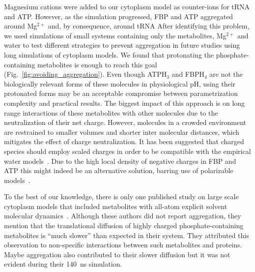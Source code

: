 \documentclass[journal=jcisd8,manuscript=article]{achemso}
\begin{document}
Magnesium cations were added to our cytoplasm model as counter-ions
for tRNA and ATP. However, as the simulation progressed, FBP and ATP
aggregated around Mg$^{2+}$ and, by consequence, around tRNA
  After identifying this problem, we used simulations of
small systems containing only the metabolites, Mg$^{2+}$ and water to
test different strategies to prevent aggregation in future studies
using long simulations of cytoplasm models. We found that protonating
the phosphate-containing metabolites is enough to reach this goal
(Fig.~\ref{fig:avoiding_aggregation}). Even though ATPH$_3$ and
FBPH$_4$ are not the biologically relevant forms of these molecules in
physiological pH, using their protonated forms may be an acceptable
compromise between parametrization complexity and practical
results. The biggest impact of this approach is on long range
interactions of these metabolites with other molecules due to the
neutralization of their net charge. However, molecules in a crowded
environment are restrained to smaller volumes and shorter inter
molecular distances, which mitigates the effect of charge
neutralization. It has been suggested that charged species should
employ scaled charges in order to be compatible with the empirical
water models~\cite{Leontyev2009a,Leontyev2011a}. Due to the high local
density of negative charges in FBP and ATP this might indeed be an
alternative solution, barring use of polarizable
models~\cite{Ponder2010a,Lopes2013a,Ghahremanpour2018b,Walz2018a}.


To the best of our knowledge, there is only one published study on large scale cytoplasm models that
included metabolites with all-atom explicit solvent molecular
dynamics~\cite{Yu2016a}. Although these authors did not report
aggregation, they mention that the translational diffusion of highly
charged phosphate-containing metabolites is ``much slower'' than
expected in their system. They attributed this observation to
non-specific interactions between such metabolites and proteins. Maybe
aggregation also contributed to their slower diffusion but it was not
evident during their \SI{140}{\nano\second} simulation.

\end{document}
